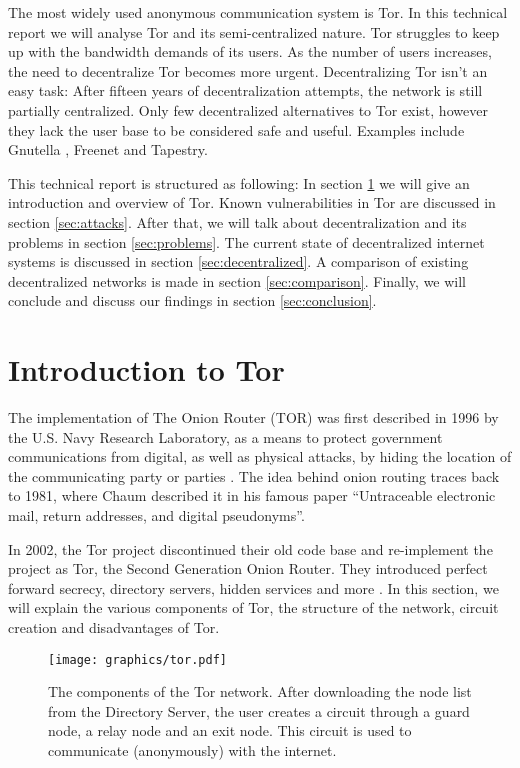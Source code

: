 \documentclass[12pt,journal,compsoc]{IEEEtran}
\begin{document}
	The most widely used anonymous communication system is Tor. In this technical report we will analyse Tor and its semi-centralized nature. Tor struggles to keep up with the bandwidth demands of its users. As the number of users increases, the need to decentralize Tor becomes more urgent. Decentralizing Tor isn't an easy task: After fifteen years of decentralization attempts, the network is still partially centralized. Only few decentralized alternatives to Tor exist, however they lack the user base to be considered safe and useful. Examples include Gnutella \cite{ripeanu2001peer}, Freenet \cite{lua2005survey} and Tapestry.
	
	This technical report is structured as following: In section \ref{sec:tor} we will give an introduction and overview of Tor. Known vulnerabilities in Tor are discussed in section \ref{sec:attacks}. After that, we will talk about decentralization and its problems in section \ref{sec:problems}. The current state of decentralized internet systems is discussed in section \ref{sec:decentralized}. A comparison of existing decentralized networks is made in section \ref{sec:comparison}. Finally, we will conclude and discuss our findings in section \ref{sec:conclusion}.
	
\section{Introduction to Tor}
	\label{sec:tor}
	
	The implementation of The Onion Router (TOR) was first described in 1996 by the U.S. Navy Research Laboratory, as a means to protect government communications from digital, as well as physical attacks, by hiding the location of the communicating party or parties \cite{goldschlag1996hiding}. The idea behind onion routing traces back to 1981, where Chaum described it in his famous paper \textquotedblleft Untraceable electronic mail, return addresses, and digital pseudonyms\textquotedblright \cite{chaum1981untraceable}.
	
	In 2002, the Tor project discontinued their old code base and re-implement the project as Tor, the Second Generation Onion Router. They introduced perfect forward secrecy, directory servers, hidden services and more \cite{dingledine2004tor}. In this section, we will explain the various components of Tor, the structure of the network, circuit creation and disadvantages of Tor.
	
	\begin{figure*}[!t]
		\centering
		\texttt{[image: graphics/tor.pdf]}
		\caption{The components of the Tor network. After downloading the node list from the Directory Server, the user creates a circuit through a guard node, a relay node and an exit node. This circuit is used to communicate (anonymously) with the internet.}
		\label{fig:tor_layout}
	\end{figure*}
\end{document}

